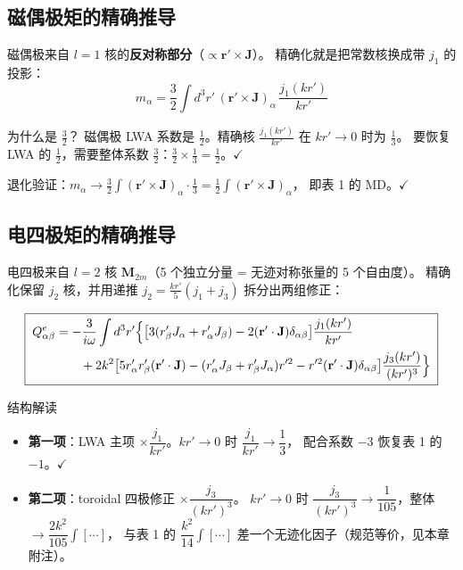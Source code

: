\subsection{磁偶极矩的精确推导}

磁偶极来自 $l=1$ 核的\textbf{反对称部分}（$\propto \mathbf{r}'\times\mathbf{J}$）。
精确化就是把常数核换成带 $j_1$ 的投影：
\begin{equation}
  \boxed{\;
  m_\alpha = \frac32\int d^3r'\,(\mathbf{r}'\times\mathbf{J})_\alpha\,\frac{j_1(kr')}{kr'}
  \;}
  \label{eq:m_exact2}
\end{equation}

\begin{stepbox}{为什么是 $\frac32$？}
磁偶极 LWA 系数是 $\frac12$。精确核 $\frac{j_1(kr')}{kr'}$ 在 $kr'\to0$ 时为 $\frac13$。
要恢复 LWA 的 $\frac12$，需要整体系数 $\frac32$：$\frac32\times\frac13=\frac12$。$\checkmark$
\end{stepbox}

退化验证：$m_\alpha \to \frac32\int(\mathbf{r}'\times\mathbf{J})_\alpha\cdot\frac13 = \frac12\int(\mathbf{r}'\times\mathbf{J})_\alpha$，
即表 1 的 MD。$\checkmark$

\subsection{电四极矩的精确推导}

电四极来自 $l=2$ 核 $\mathbf{M}_{2m}$（5 个独立分量 = 无迹对称张量的 5 个自由度）。
精确化保留 $j_2$ 核，并用递推 $j_2 = \frac{kr'}{5}(j_1+j_3)$ 拆分出两组修正：

\begin{equation}
  \boxed{\;
    \begin{aligned}
    Q^e_{\alpha\beta} &= -\frac{3}{i\omega}\int d^3r'\Bigl\{
      \bigl[3(r'_\beta J_\alpha + r'_\alpha J_\beta) - 2(\mathbf{r}'\cdot\mathbf{J})\delta_{\alpha\beta}\bigr]
      \frac{j_1(kr')}{kr'} \\
    &\qquad + 2k^2\bigl[5r'_\alpha r'_\beta(\mathbf{r}'\cdot\mathbf{J})
      - (r'_\alpha J_\beta + r'_\beta J_\alpha)r'^2 - r'^2(\mathbf{r}'\cdot\mathbf{J})\delta_{\alpha\beta}\bigr]
      \frac{j_3(kr')}{(kr')^3}
    \Bigr\}
    \end{aligned}
    \;}
  \label{eq:Qe_exact2}
\end{equation}

\begin{stepbox}{结构解读}
\begin{itemize}
  \item \textbf{第一项}：LWA 主项 $\times\dfrac{j_1}{kr'}$。$kr'\to0$ 时 $\dfrac{j_1}{kr'}\to\dfrac13$，
    配合系数 $-3$ 恢复表 1 的 $-1$。$\checkmark$
  \item \textbf{第二项}：toroidal 四极修正 $\times\dfrac{j_3}{(kr')^3}$。
    $kr'\to0$ 时 $\dfrac{j_3}{(kr')^3}\to\dfrac1{105}$，整体 $\to\dfrac{2k^2}{105}\int[\cdots]$，
    与表 1 的 $\dfrac{k^2}{14}\int[\cdots]$ 差一个无迹化因子（规范等价，见本章附注）。
\end{itemize}
\end{stepbox}

